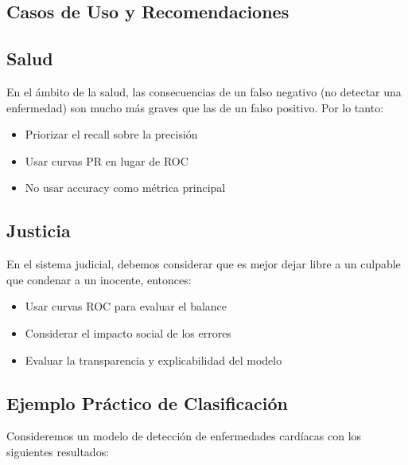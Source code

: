 \documentclass[12pt]{article}
\begin{document}
\subsection{Casos de Uso y Recomendaciones}

\subsection{Salud}
En el ámbito de la salud, las consecuencias de un falso negativo (no detectar una enfermedad) son mucho más graves que las de un falso positivo. Por lo tanto:
\begin{itemize}
    \item Priorizar el recall sobre la precisión
    \item Usar curvas PR en lugar de ROC
    \item No usar accuracy como métrica principal
\end{itemize}

\subsection{Justicia}
En el sistema judicial, debemos considerar que es mejor dejar libre a un culpable que condenar a un inocente, entonces:
\begin{itemize}
    \item Usar curvas ROC para evaluar el balance
    \item Considerar el impacto social de los errores
    \item Evaluar la transparencia y explicabilidad del modelo
\end{itemize}

\subsection{Ejemplo Práctico de Clasificación}
Consideremos un modelo de detección de enfermedades cardíacas con los siguientes resultados:

\begin{center}
\end{center}
\end{document}
